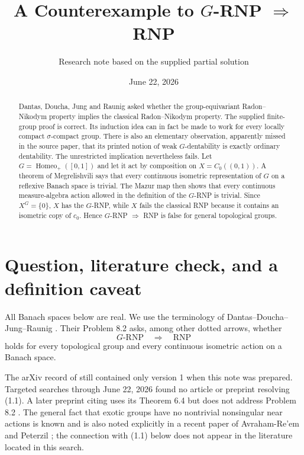 \documentclass[11pt]{article}
\title{A Counterexample to \texorpdfstring{$G$-RNP $\Rightarrow$ RNP}{G-RNP implies RNP}}
\author{Research note based on the supplied partial solution}
\date{June 22, 2026}
\theoremstyle{remark}
\newcommand{\RNP}{\mathrm{RNP}}
\newcommand{\Homeo}{\operatorname{Homeo}}
\begin{document}
\maketitle

\begin{abstract}
Dantas, Doucha, Jung and Raunig asked whether the group-equivariant
Radon--Nikodym property implies the classical Radon--Nikodym property.
The supplied finite-group proof is correct.  Its induction idea can in fact
be made to work for every locally compact $\sigma$-compact group.  There is
also an elementary observation, apparently missed in the source paper, that
its printed notion of weak $G$-dentability is exactly ordinary dentability.
The unrestricted implication nevertheless fails.  Let
$G=\Homeo_+([0,1])$ and let it act by composition on
$X=C_0((0,1))$.  A theorem of Megrelishvili says that every continuous
isometric representation of $G$ on a reflexive Banach space is trivial.
The Mazur map then shows that every continuous measure-algebra action
allowed in the definition of the $G$-RNP is trivial.  Since $X^G=\{0\}$,
$X$ has the $G$-RNP, while $X$ fails the classical RNP because it contains
an isometric copy of $c_0$.  Hence $G$-RNP $\Rightarrow$ RNP is false for
general topological groups.
\end{abstract}

\section{Question, literature check, and a definition caveat}

All Banach spaces below are real.  We use the terminology of
Dantas--Doucha--Jung--Raunig \cite{DDJR}.  Their Problem 8.2 asks, among
other dotted arrows, whether
\begin{equation}
  G\text{-}\RNP \quad\Longrightarrow\quad \RNP
  \tag{1.1}
\end{equation}
holds for every topological group and every continuous isometric action on a
Banach space.

The arXiv record of \cite{DDJR} still contained only version 1 when this note
was prepared.  Targeted searches through June 22, 2026 found no article or
preprint resolving (1.1).  A later preprint citing \cite{DDJR} uses its
Theorem 6.4 but does not address Problem 8.2 \cite{Daugavet}.  The general
fact that exotic groups have no nontrivial nonsingular near actions is known
and is also noted explicitly in a recent paper of Avraham-Re'em and Peterzil
\cite{AP}; the connection with (1.1) below does not appear in the literature
located in this search.
\end{document}
